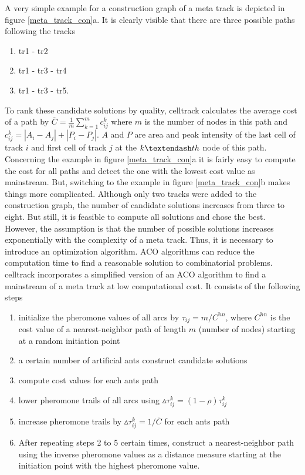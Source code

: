 \documentclass{scrartcl}
\begin{document}
A very simple example for a construction graph of a meta track is depicted in figure \ref{meta_track_con}a. It is clearly visible that there are three possible paths following the tracks
\begin{enumerate}
	\item tr1 - tr2
	\item tr1 - tr3 - tr4	
	\item tr1 - tr3 - tr5.
\end{enumerate}
To rank these candidate solutions by quality, celltrack calculates the average cost of a path by $\overline{C}=\frac{1}{m}\sum_{k=1}^{m}{c_{ij}^k}$ where $m$ is the number of nodes in this path and $c_{ij}^k=|A_i-A_j| + |P_i-P_j|$. $A$ and $P$ are area and peak intensity of the last cell of track $i$ and first cell of track $j$ at the $k\textendash th$ node of this path. Concerning the example in figure \ref{meta_track_con}a it is fairly easy to compute the cost for all paths and detect the one with the lowest cost value as mainstream. But, switching to the example in figure \ref{meta_track_con}b makes things more complicated. Although only two tracks were added to the construction graph, the number of candidate solutions increases from three to eight. But still, it is feasible to compute all solutions and chose the best. However, the assumption is that the number of possible solutions increases exponentially with the complexity of a meta track. Thus, it is necessary to introduce an optimization algorithm. ACO algorithms can reduce the computation time to find a reasonable solution to combinatorial problems. celltrack incorporates a simplified version of an ACO algorithm \citep{DorSta2004:book} to find a mainstream of a meta track at low computational cost. It consists of the following steps
\begin{enumerate}
	\item initialize the pheromone values of all arcs by $\tau_{ij}=m/\overline{C^{nn}}$, where $\overline{C^{nn}}$ is the cost value of a nearest-neighbor path of length $m$ (number of nodes) starting at a random initiation point
	\item a certain number of artificial ants construct candidate solutions
	\item compute cost values for each ants path
	\item lower pheromone trails of all arcs using $\vartriangle \tau_{ij}^{k}=(1-\rho)\tau_{ij}^{k}$
	\item increase pheromone trails by $\vartriangle \tau_{ij}^k=1/\overline{C}$ for each ants path
	\item After repeating steps 2 to 5 certain times, construct a nearest-neighbor path using the inverse pheromone values as a distance measure starting at the initiation point with the highest pheromone value.
\end{enumerate}
\end{document}
